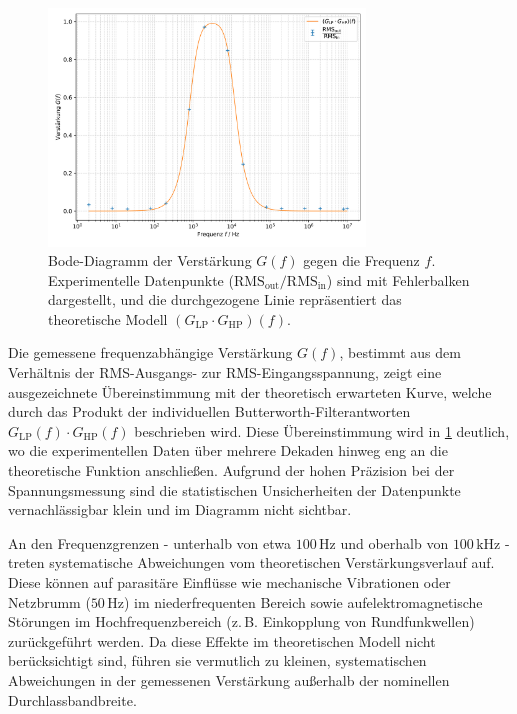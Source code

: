\begin{figure}[htbp]
    \centering
    \includegraphics[width=0.75\textwidth]{figs/Gvsf.png}
    \caption{Bode-Diagramm der Verstärkung $G(f)$ gegen die Frequenz $f$. Experimentelle Datenpunkte ($\mathrm{RMS}_{\mathrm{out}}/\mathrm{RMS}_{\mathrm{in}}$) sind mit Fehlerbalken dargestellt, und die durchgezogene Linie repräsentiert das theoretische Modell $(G_{\mathrm{LP}}\cdot G_{\mathrm{HP}})(f)$.}

    \label{fig:gvsf}
\end{figure}

Die gemessene frequenzabhängige Verstärkung $G(f)$, bestimmt aus dem Verhältnis der RMS-Ausgangs- zur RMS-Eingangsspannung, zeigt eine ausgezeichnete Übereinstimmung mit der theoretisch erwarteten Kurve, welche durch das Produkt der individuellen Butterworth-Filterantworten $G_{\mathrm{LP}}(f)\cdot G_{\mathrm{HP}}(f)$ beschrieben wird. 
Diese Übereinstimmung wird in \cref{fig:gvsf} deutlich, wo die experimentellen Daten über mehrere Dekaden hinweg eng an die theoretische Funktion anschließen. 
Aufgrund der hohen Präzision bei der Spannungsmessung sind die statistischen Unsicherheiten der Datenpunkte vernachlässigbar klein und im Diagramm nicht sichtbar.

An den Frequenzgrenzen - unterhalb von etwa $100\,\mathrm{Hz}$ und oberhalb von $100\,\mathrm{kHz}$ - treten systematische Abweichungen vom theoretischen Verstärkungsverlauf auf. 
Diese können auf parasitäre Einflüsse wie mechanische Vibrationen oder Netzbrumm ($50\, \mathrm{Hz}$) im niederfrequenten Bereich sowie aufelektromagnetische Störungen im Hochfrequenzbereich (z.\,B. Einkopplung von Rundfunkwellen) zurückgeführt werden. 
Da diese Effekte im theoretischen Modell nicht berücksichtigt sind, führen sie vermutlich zu kleinen, systematischen Abweichungen in der gemessenen Verstärkung außerhalb der nominellen Durchlassbandbreite.

